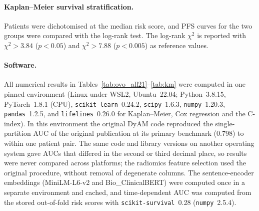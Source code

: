 \paragraph{Kaplan--Meier survival stratification.}
Patients were dichotomised at the median risk score, and PFS curves for the
two groups were compared with the log-rank test.
The log-rank $\chi^2$ is reported with $\chi^2 > 3.84$ ($p < 0.05$) and
$\chi^2 > 7.88$ ($p < 0.005$) as reference values.

\paragraph{Software.}
All numerical results in Tables~\ref{tab:ovo_all21}--\ref{tab:km} were computed in one pinned environment
(Linux under WSL2, Ubuntu~22.04; Python~3.8.15, PyTorch~1.8.1 (CPU), \texttt{scikit-learn}~0.24.2,
\texttt{scipy}~1.6.3, \texttt{numpy}~1.20.3, \texttt{pandas}~1.2.5, and \texttt{lifelines}~0.26.0 for
Kaplan--Meier, Cox regression and the C-index). In this environment the original DyAM code reproduced the
single-partition AUC of the original publication at its primary benchmark (0.798) to within one patient pair.
The same code and library versions on another operating system gave AUCs that differed in the second or
third decimal place, so results were never compared across platforms; the radiomics feature selection used
the original procedure, without removal of degenerate columns. The sentence-encoder embeddings (MiniLM-L6-v2
and Bio\_ClinicalBERT) were computed once in a separate environment and cached, and time-dependent AUC was
computed from the stored out-of-fold risk scores with \texttt{scikit-survival}~0.28 (\texttt{numpy}~2.5.4).

